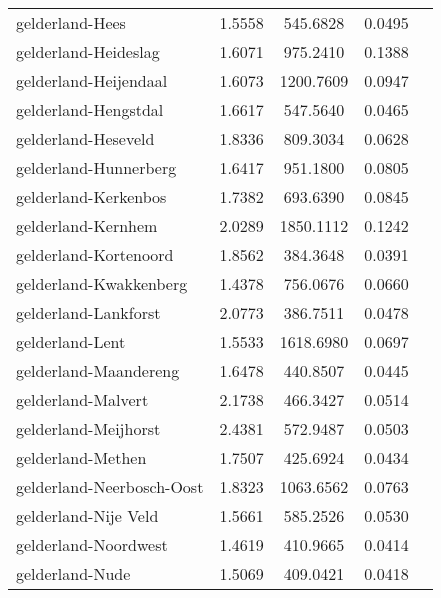 \begin{longtable}{llccc}
	gelderland-Hees                           & 1.5558  & 545.6828  & 0.0495                 \\
	gelderland-Heideslag                      & 1.6071  & 975.2410  & 0.1388                 \\
	gelderland-Heijendaal                     & 1.6073  & 1200.7609 & 0.0947                 \\
	gelderland-Hengstdal                      & 1.6617  & 547.5640  & 0.0465                 \\
	gelderland-Heseveld                       & 1.8336  & 809.3034  & 0.0628                 \\
	gelderland-Hunnerberg                     & 1.6417  & 951.1800  & 0.0805                 \\
	gelderland-Kerkenbos                      & 1.7382  & 693.6390  & 0.0845                 \\
	gelderland-Kernhem                        & 2.0289  & 1850.1112 & 0.1242                 \\
	gelderland-Kortenoord                     & 1.8562  & 384.3648  & 0.0391                 \\
	gelderland-Kwakkenberg                    & 1.4378  & 756.0676  & 0.0660                 \\
	gelderland-Lankforst                      & 2.0773  & 386.7511  & 0.0478                 \\
	gelderland-Lent                           & 1.5533  & 1618.6980 & 0.0697                 \\
	gelderland-Maandereng                     & 1.6478  & 440.8507  & 0.0445                 \\
	gelderland-Malvert                        & 2.1738  & 466.3427  & 0.0514                 \\
	gelderland-Meijhorst                      & 2.4381  & 572.9487  & 0.0503                 \\
	gelderland-Methen                         & 1.7507  & 425.6924  & 0.0434                 \\
	gelderland-Neerbosch-Oost                 & 1.8323  & 1063.6562 & 0.0763                 \\
	gelderland-Nije Veld                      & 1.5661  & 585.2526  & 0.0530                 \\
	gelderland-Noordwest                      & 1.4619  & 410.9665  & 0.0414                 \\
	gelderland-Nude                           & 1.5069  & 409.0421  & 0.0418                 \\

\end{longtable}
